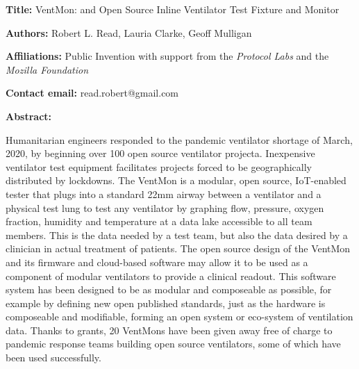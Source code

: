 \documentclass[11pt, letterpaper]{article}
\begin{document}
\begin{flushleft}


\setlength{\parindent}{0pt}
\setlength{\parskip}{10pt}

\textbf{Title:} VentMon: and Open Source Inline Ventilator Test Fixture and Monitor

\textbf{Authors:} Robert L. Read, Lauria Clarke, Geoff Mulligan

\textbf{Affiliations:} Public Invention with support from the \textit{Protocol Labs} and the \textit{Mozilla Foundation}

\textbf{Contact email:} read.robert@gmail.com

\textbf{Abstract:}

Humanitarian engineers responded to the pandemic ventilator shortage of March,
2020, by beginning over 100 open source ventilator projecta\cite{COVID19VENTLIST,pearce2020review}.
Inexpensive ventilator test equipment facilitates projects forced
to be geographically distributed by lockdowns.
The VentMon is a modular, open source, IoT-enabled
tester that plugs into a standard 22mm airway
between a ventilator and a physical test lung to test any ventilator
by graphing flow, pressure, oxygen fraction, humidity and temperature
at a data lake accessible to all team members. This is the data
needed by a test team, but also the data desired by a clinician in
actual treatment of patients. The open source design of the VentMon
and its firmware and cloud-based software may
allow it to be used as a component of modular ventilators to provide
a clinical readout. This software system has been designed to be as
modular and composeable as possible, for example by defining
new open published standards, just as the hardware is composeable
and modifiable, forming an open system or eco-system of ventilation data.
Thanks to grants, 20 VentMons have been given away
free of charge to pandemic response teams building open source ventilators,
some of which have been used successfully.




\end{flushleft}
\end{document}

